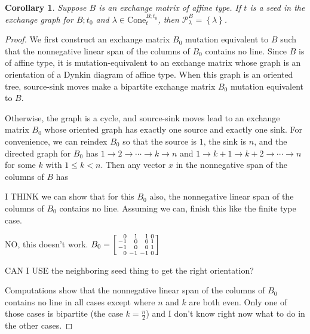 \documentclass{amsart}
\newtheorem{corollary}[proposition]{Corollary}
\theoremstyle{definition}
\theoremstyle{remark}
\numberwithin{equation}{section}
\newcommand{\set}[1]{{\left\lbrace #1 \right\rbrace}}
\newcommand{\0}{{\mathbf{0}}}
\newcommand{\Cone}{\mathrm{Cone}}
\renewcommand{\P}{\mathcal{P}}
\begin{document}
\begin{corollary}\label{affine P point}  
Suppose $B$ is an exchange matrix of affine type.
If $t$ is a seed in the exchange graph for $B;t_0$ and $\lambda\in\Cone^{B;t_0}_t$, then $\P^B_\lambda=\set{\lambda}$.
\end{corollary}
\begin{proof}
We first construct an exchange matrix $B_0$ mutation equivalent to $B$ such that the nonnegative linear span of the columns of $B_0$ contains no line.
Since $B$ is of affine type, it is mutation-equivalent to an exchange matrix whose graph is an orientation of a Dynkin diagram of affine type.
When this graph is an oriented tree, source-sink moves make a bipartite exchange matrix $B_0$ mutation equivalent to $B$.

Otherwise, the graph is a cycle, and source-sink moves lead to an exchange matrix $B_0$ whose oriented graph has exactly one source and exactly one sink.
For convenience, we can reindex $B_0$ so that the source is $1$, the sink is $n$, and the directed graph for $B_0$ has $1\to2\to\cdots\to k\to n$ and $1\to k+1\to k+2\to\cdots\to n$ for some $k$ with $1\le k<n$.
Then any vector $x$ in the nonnegative span of the columns of $B$ has 



I THINK we can show that for this $B_0$ also, the nonnegative linear span of the columns of $B_0$ contains no line.
Assuming we can, finish this like the finite type case.

NO, this doesn't work.
$B_0=\begin{bsmallmatrix*}[r]0&1&1&0\\-1&0&0&1\\-1&0&0&1\\0&-1&-1&0\end{bsmallmatrix*}$


CAN I USE the neighboring seed thing to get the right orientation?

Computations show that the nonnegative linear span of the columns of $B_0$ contains no line in all cases except where $n$ and $k$ are both even.  
Only one of those cases is bipartite (the case $k=\frac n2$) and I don't know right now what to do in the other cases.
\end{proof}
\end{document}
